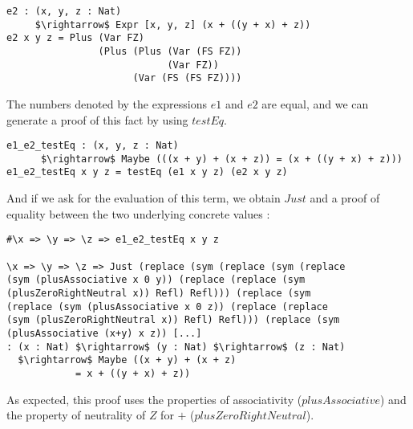 \begin{lstlisting}
e2 : (x, y, z : Nat) 
     $\rightarrow$ Expr [x, y, z] (x + ((y + x) + z))
e2 x y z = Plus (Var FZ) 
                (Plus (Plus (Var (FS FZ)) 
                            (Var FZ)) 
                      (Var (FS (FS FZ))))
\end{lstlisting}


The numbers denoted by the expressions $e1$ and $e2$ are equal, and we can generate a proof of this fact by using $testEq$.


\begin{lstlisting}
e1_e2_testEq : (x, y, z : Nat) 
      $\rightarrow$ Maybe (((x + y) + (x + z)) = (x + ((y + x) + z)))
e1_e2_testEq x y z = testEq (e1 x y z) (e2 x y z)
\end{lstlisting}



And if we ask for the evaluation of this term, we obtain $Just$ and a proof of equality between the two underlying concrete values :


\begin{lstlisting}
#\x => \y => \z => e1_e2_testEq x y z

\x => \y => \z => Just (replace (sym (replace (sym (replace 
(sym (plusAssociative x 0 y)) (replace (replace (sym 
(plusZeroRightNeutral x)) Refl) Refl))) (replace (sym 
(replace (sym (plusAssociative x 0 z)) (replace (replace 
(sym (plusZeroRightNeutral x)) Refl) Refl))) (replace (sym 
(plusAssociative (x+y) x z)) [...]
: (x : Nat) $\rightarrow$ (y : Nat) $\rightarrow$ (z : Nat) 
  $\rightarrow$ Maybe ((x + y) + (x + z) 
            = x + ((y + x) + z))
\end{lstlisting}

As expected, this proof uses the properties of associativity ($plusAssociative$) and the property of neutrality of $Z$ for $+$ ($plusZeroRightNeutral$).


